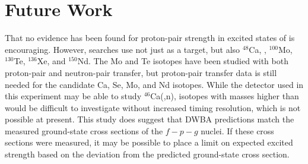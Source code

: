 \section{Future Work}
\begin{comment}
Weaknesses of this work are: 
1. STATISTICS LIMITED AARGH!!!  liquid scintillator would be helpful in reclaiming low-energy transfer neutron hits which could improve statistics by ~30\% (<- this is NOT currently precise!)
2. momentum mismatching between the pair transfer we're looking at and pair correlations most relevant to \zvbb?  
3. ?? come on there must be other issues

Future work that would be helpful would be
1. looking at this pair transfer on other targets
2. leptonic probes that could excite pair correlations at higher momenta? \cite{LeptonPP}
\end{comment}
That no evidence has been found for proton-pair strength in excited \zp states of \GeTargets is encouraging.  However, \zvbb searches use not just  as a target, but also $^{48}$Ca, , $^{100}$Mo, $^{130}$Te, $^{136}$Xe, and $^{150}$Nd.  The Mo and Te isotopes have been studied with both proton-pair and neutron-pair transfer, but proton-pair transfer data is still needed for the candidate Ca, Se, Mo, and Nd isotopes.  While the detector used in this experiment may be able to study $^{46}$Ca(,n), isotopes with masses higher than \GeTargets would be difficult to investigate without increased timing resolution, which is not possible at present.  This study does suggest that DWBA predictions match the measured ground-state cross sections of the $f-p-g$ nuclei.  If these cross sections were measured, it may be possible to place a limit on expected excited \zp strength based on the deviation from the predicted ground-state cross section.

%
% 
% 
